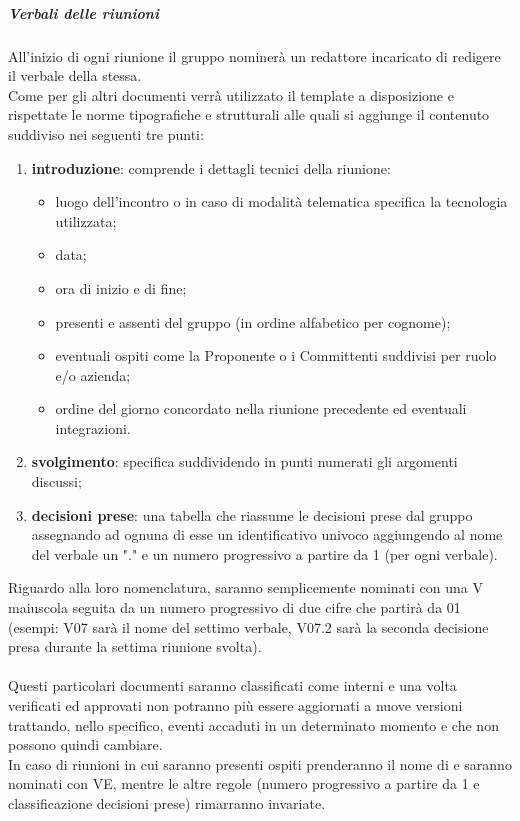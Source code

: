     	\subparagraph{Verbali delle riunioni}
    	All'inizio di ogni riunione il gruppo nominerà un redattore incaricato di redigere il verbale della stessa.\\
    	Come per gli altri documenti verrà utilizzato il template a disposizione e rispettate le norme tipografiche e strutturali alle quali si aggiunge il contenuto suddiviso nei seguenti tre punti:
    	\begin{enumerate}
    		\item \textbf{introduzione}: comprende i dettagli tecnici della riunione:
    		\begin{itemize}
    			\item luogo dell'incontro o in caso di modalità telematica specifica la tecnologia utilizzata;
    			\item data;
    			\item ora di inizio e di fine;
    			\item presenti e assenti del gruppo (in ordine alfabetico per cognome);
    			\item eventuali ospiti come la Proponente o i Committenti suddivisi per ruolo e/o azienda;
    			\item ordine del giorno concordato nella riunione precedente ed eventuali integrazioni.
    		\end{itemize}
    		\item \textbf{svolgimento}: specifica suddividendo in punti numerati gli argomenti discussi;
    		\item \textbf{decisioni prese}: una tabella che riassume le decisioni prese dal gruppo assegnando ad ognuna di esse un identificativo univoco aggiungendo al nome del verbale un "." e un numero progressivo a partire da 1 (per ogni verbale).
    	\end{enumerate}
    	Riguardo alla loro nomenclatura, saranno semplicemente nominati con una V maiuscola seguita da un numero progressivo di due cifre che partirà da 01 (esempi: V07 sarà il nome del settimo verbale, V07.2 sarà la seconda decisione presa durante la settima riunione svolta).\\
    	\\Questi particolari documenti saranno classificati come interni e una volta verificati ed approvati non potranno più essere aggiornati a nuove versioni trattando, nello specifico, eventi accaduti in un determinato momento e che non possono quindi cambiare.
    	\\In caso di riunioni in cui saranno presenti ospiti prenderanno il nome di  e saranno nominati con VE, mentre le altre regole (numero progressivo a partire da 1 e classificazione decisioni prese) rimarranno invariate.
	
